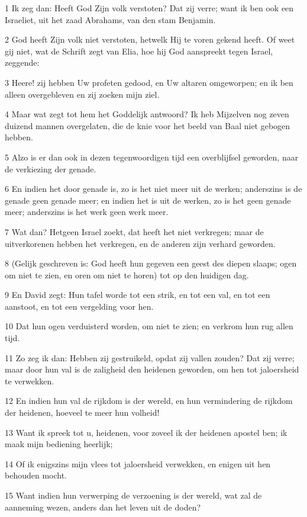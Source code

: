 \par 1 Ik zeg dan: Heeft God Zijn volk verstoten? Dat zij verre; want ik ben ook een Israeliet, uit het zaad Abrahams, van den stam Benjamin.
\par 2 God heeft Zijn volk niet verstoten, hetwelk Hij te voren gekend heeft. Of weet gij niet, wat de Schrift zegt van Elia, hoe hij God aanspreekt tegen Israel, zeggende:
\par 3 Heere! zij hebben Uw profeten gedood, en Uw altaren omgeworpen; en ik ben alleen overgebleven en zij zoeken mijn ziel.
\par 4 Maar wat zegt tot hem het Goddelijk antwoord? Ik heb Mijzelven nog zeven duizend mannen overgelaten, die de knie voor het beeld van Baal niet gebogen hebben.
\par 5 Alzo is er dan ook in dezen tegenwoordigen tijd een overblijfsel geworden, naar de verkiezing der genade.
\par 6 En indien het door genade is, zo is het niet meer uit de werken; anderszins is de genade geen genade meer; en indien het is uit de werken, zo is het geen genade meer; anderszins is het werk geen werk meer.
\par 7 Wat dan? Hetgeen Israel zoekt, dat heeft het niet verkregen; maar de uitverkorenen hebben het verkregen, en de anderen zijn verhard geworden.
\par 8 (Gelijk geschreven is: God heeft hun gegeven een geest des diepen slaaps; ogen om niet te zien, en oren om niet te horen) tot op den huidigen dag.
\par 9 En David zegt: Hun tafel worde tot een strik, en tot een val, en tot een aanstoot, en tot een vergelding voor hen.
\par 10 Dat hun ogen verduisterd worden, om niet te zien; en verkrom hun rug allen tijd.
\par 11 Zo zeg ik dan: Hebben zij gestruikeld, opdat zij vallen zouden? Dat zij verre; maar door hun val is de zaligheid den heidenen geworden, om hen tot jaloersheid te verwekken.
\par 12 En indien hun val de rijkdom is der wereld, en hun vermindering de rijkdom der heidenen, hoeveel te meer hun volheid!
\par 13 Want ik spreek tot u, heidenen, voor zoveel ik der heidenen apostel ben; ik maak mijn bediening heerlijk;
\par 14 Of ik enigszins mijn vlees tot jaloersheid verwekken, en enigen uit hen behouden mocht.
\par 15 Want indien hun verwerping de verzoening is der wereld, wat zal de aanneming wezen, anders dan het leven uit de doden?
